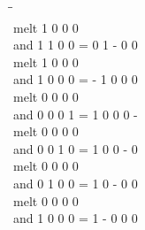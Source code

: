 \documentclass{article}
\begin{document}
\newpage
\begin{tabbing}
\hspace{3cm}\=\hspace{3cm}\=\hspace{3cm}\\[1cm]
melt  1  0  0  0 \\
and  1  1  0  0 \>
 =  0  1  -  0  0 \\[1mm]
melt  1  0  0  0 \\
and  1  0  0  0 \>
 =  -  1  0  0  0 \\[1mm]
melt  0  0  0  0 \\
and  0  0  0  1 \>
 =  1  0  0  0  - \\[1mm]
melt  0  0  0  0 \\
and  0  0  1  0 \>
 =  1  0  0  -  0 \\[1mm]
melt  0  0  0  0 \\
and  0  1  0  0 \>
 =  1  0  -  0  0 \\[1mm]
melt  0  0  0  0 \\
and  1  0  0  0 \>
 =  1  -  0  0  0 \\[1mm]
\end{tabbing}
\newpage
\end{document}
